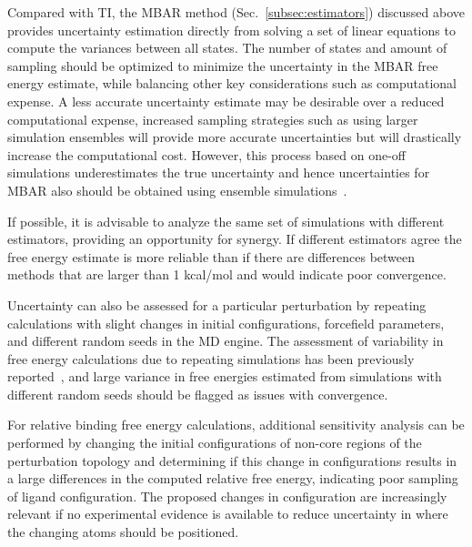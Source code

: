 \documentclass[9pt,bestpractices]{livecoms}
\begin{document}
Compared with TI, the MBAR method (Sec.~\ref{subsec:estimators}) discussed above provides uncertainty estimation directly from solving a set of linear equations to compute the variances between all states. 
The number of states and amount of sampling should be optimized to minimize the uncertainty in the MBAR free energy estimate, while balancing other key considerations such as computational expense. 
A less accurate uncertainty estimate may be desirable over a reduced computational expense, increased sampling strategies such as using larger simulation ensembles will provide more accurate uncertainties but will drastically increase the computational cost. 
However, this process based on one-off simulations underestimates the true uncertainty and hence uncertainties for MBAR also should be obtained using ensemble simulations~\cite{bhati2018, wade2022}.

If possible, it is advisable to analyze the same set of simulations with different estimators, providing an opportunity for synergy. If different estimators agree the free energy estimate is more reliable than if there are differences between methods that are larger than 1 kcal/mol and would indicate poor convergence. 

Uncertainty can also be assessed for a particular perturbation by repeating calculations with slight changes in initial configurations, forcefield parameters, and different random seeds in the MD engine. 
The assessment of variability in free energy calculations due to repeating simulations has been previously reported~\cite{aldeghi2019accurate,paliwal2011benchmark,mey2016blinded,mey2018impact}, and large variance in free energies estimated from simulations with different random seeds should be flagged as issues with convergence. 

For relative binding free energy calculations, additional sensitivity analysis can be performed by changing the initial configurations of non-core regions of the perturbation topology and determining if this change in configurations results in a large differences in the computed relative free energy, indicating poor sampling of ligand configuration.
The proposed changes in configuration are increasingly relevant if no experimental evidence is available to reduce uncertainty in where the changing atoms should be positioned.
\end{document}
